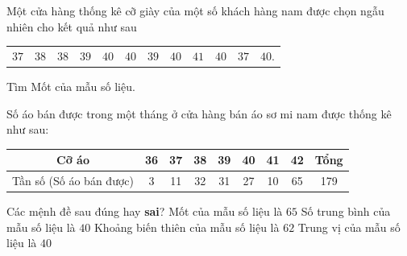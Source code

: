 \begin{bt}%
	Một cửa hàng thống kê cỡ giày của một số khách hàng nam được chọn ngẫu nhiên cho kết quả như sau
	\begin{center}
		\begin{tabular}{llllllllllll}
			$37$ & $38$ & $38$ & $39$ & $40$ & $40$ & $39$ & $40$ & $41$ & $40$ & $37$ & $40$.
		\end{tabular}
	\end{center}
	Tìm Mốt của mẫu số liệu.
\end{bt}

\begin{ex}%
	Số áo bán được trong một tháng ở cửa hàng bán áo sơ mi nam được thống kê như sau:
	\begin{center}
		\begin{tabular}{|c|c|c|c|c|c|c|c|c|}
			\hline
			Cỡ áo&36&37&38&39&40&41&42&Tổng\\
			\hline
			Tần số (Số áo bán được) &3&11&32&31&27&10&65&179\\
			\hline
		\end{tabular}
	\end{center}
	Các mệnh đề sau đúng hay \textbf{sai}?
	\choiceTF
	{Mốt của mẫu số liệu là $65$}
	{\True Số trung bình của mẫu số liệu là $40$}
	{Khoảng biến thiên của mẫu số liệu là $62$}
	{\True Trung vị của mẫu số liệu là $40$}
\end{ex}

